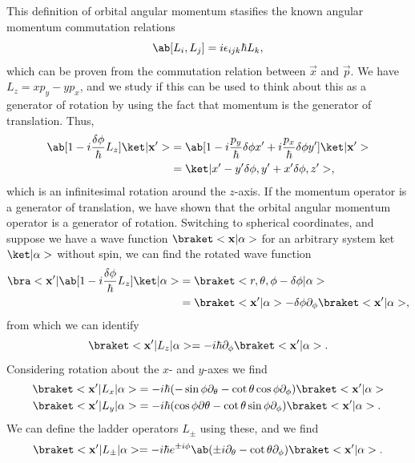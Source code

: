 This definition of orbital angular momentum stasifies the known angular momentum commutation relations
\begin{equation}
    \comm{L_i}{L_j} = i \epsilon_{ijk} \hbar L_k,
\end{equation}
which can be proven from the commutation relation between $\vec{x}$ and $\vec{p}$. We have $L_z = xp_y - yp_x$, and we study if this can be used to think about this as a generator of rotation by using the fact that momentum is the generator of translation. Thus,
\begin{align}
    \ab[1 - i \frac{\delta \phi}{\hbar} L_z] \k{\vec{x}'} &= \ab [ 1 - i \frac{p_y}{\hbar} \delta\phi x' + i \frac{p_x}{\hbar} \delta\phi y']\k{\vec{x}'}\\
    &= \k{x' - y'\delta\phi, y' + x'\delta\phi, z'},
\end{align}
which is an infinitesimal rotation around the $z$-axis. If the momentum operator is a generator of translation, we have shown that the orbital angular momentum operator is a generator of rotation. Switching to spherical coordinates, and suppose we have a wave function $\bk{\vec{x}}{\alpha}$ for an arbitrary system ket $\k{\alpha}$ without spin, we can find the rotated wave function
\begin{align}
    \b{\vec{x}'} \ab [1 - i \frac{\delta\phi}{\hbar} L_z] \k{\alpha} &= \bk{r, \theta, \phi - \delta \phi}{\alpha}\\
    &= \bk{\vec{x}'}{\alpha} - \delta\phi \partial_\phi \bk{\vec{x}'}{\alpha},
\end{align}
from which we can identify
\begin{equation}
    \bkop{\vec{x}'}{L_z}{\alpha} = - i\hbar \partial_\phi \bk{\vec{x}'}{\alpha}.
\end{equation}
Considering rotation about the $x$- and $y$-axes we find
\begin{align}
    \bkop{\vec{x}'}{L_x}{\alpha} &= - i\hbar (-\sin\phi \partial_\theta - \cot\theta\cos\phi \partial_\phi)\bk{\vec{x}'}{\alpha}\\
    \bkop{\vec{x}'}{L_y}{\alpha} &= -i\hbar (\cos\phi \partial\theta - \cot\theta\sin\phi \partial_\phi) \bk{\vec{x}'}{\alpha}.
\end{align}
We can define the ladder operators $L_\pm$ using these, and we find
\begin{equation}
    \bkop{\vec{x}'}{L_\pm}{\alpha} = -i\hbar e^{\pm i \phi} \ab (\pm i\partial_\theta - \cot\theta \partial_\phi)\bk{\vec{x}'}{\alpha}.
\end{equation}
